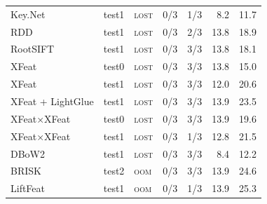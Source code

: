 \begin{table}[H]
\begin{tabular}{@{}lllrrrr@{}}
Key.Net & test1 & \textsc{lost} & 0/3 & 1/3 & 8.2 & 11.7 \\
RDD & test1 & \textsc{lost} & 0/3 & 2/3 & 13.8 & 18.9 \\
RootSIFT & test1 & \textsc{lost} & 0/3 & 3/3 & 13.8 & 18.1 \\
XFeat & test0 & \textsc{lost} & 0/3 & 3/3 & 13.8 & 15.0 \\
XFeat & test1 & \textsc{lost} & 0/3 & 3/3 & 12.0 & 20.6 \\
XFeat + LightGlue & test1 & \textsc{lost} & 0/3 & 3/3 & 13.9 & 23.5 \\
XFeat×XFeat & test0 & \textsc{lost} & 0/3 & 3/3 & 13.9 & 19.6 \\
XFeat×XFeat & test1 & \textsc{lost} & 0/3 & 1/3 & 12.8 & 21.5 \\
DBoW2 & test1 & \textsc{lost} & 0/3 & 3/3 & 8.4 & 12.2 \\
BRISK & test2 & \textsc{oom} & 0/3 & 3/3 & 13.9 & 24.6 \\
LiftFeat & test1 & \textsc{oom} & 0/3 & 1/3 & 13.9 & 25.3 \\
\bottomrule
\end{tabular}
\end{table}
